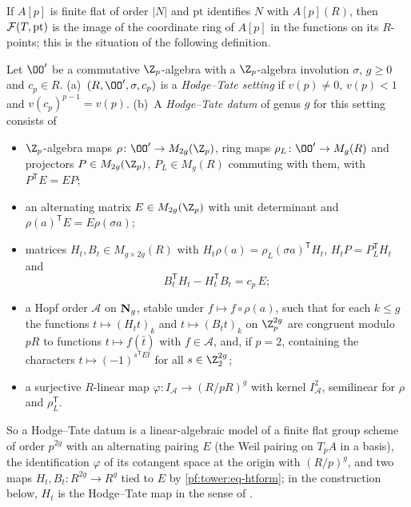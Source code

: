 If $A[p]$ is finite flat of order $|N|$ and $\mathrm{pt}$ identifies $N$ with $A[p](R)$, then $\mathcal F(T,\mathrm{pt})$ is
the image of the coordinate ring of $A[p]$ in the functions on its $R$-points; this is the situation of the following
definition.

\begin{definition}\label{pf:tower:def-htdatum}
Let $\OO'$ be a commutative $\Z_p$-algebra with a $\Z_p$-algebra involution $\sigma$, $g\ge0$ and $c_p\in R$.
(a)~$(R,\OO',\sigma,c_p)$ is a \emph{Hodge--Tate setting} if $v(p)\ne0$, $v(p)<1$ and $v(c_p)^{p-1}=v(p)$.
(b)~A \emph{Hodge--Tate datum} of genus $g$ for this setting consists of
\begin{itemize}
\item $\Z_p$-algebra maps $\rho\colon\OO'\to M_{2g}(\Z_p)$, ring maps $\rho_L\colon\OO'\to M_g(R)$ and
  projectors $P\in M_{2g}(\Z_p)$, $P_L\in M_g(R)$ commuting with them, with $P^{\mathsf T}E=EP$;
\item an alternating matrix $E\in M_{2g}(\Z_p)$ with unit determinant and $\rho(a)^{\mathsf T}E=E\rho(\sigma a)$;
\item matrices $H_t,B_t\in M_{g\times2g}(R)$ with $H_t\rho(a)=\rho_L(\sigma a)^{\mathsf T}H_t$,
  $H_tP=P_L^{\mathsf T}H_t$ and
  \begin{equation}\label{pf:tower:eq-htform}
  B_t^{\mathsf T}H_t-H_t^{\mathsf T}B_t=c_p\,E;
  \end{equation}
\item a Hopf order $\mathcal A$ on $\mathbf N_g$, stable under $f\mapsto f\circ\rho(a)$, such that for each
  $k\le g$ the functions $t\mapsto(H_tt)_k$ and $t\mapsto(B_tt)_k$ on $\Z_p^{2g}$ are congruent modulo $pR$ to
  functions $t\mapsto f(\bar t)$ with $f\in\mathcal A$, and, if $p=2$, containing the characters
  $t\mapsto(-1)^{s^{\mathsf T}Et}$ for all $s\in\Z_2^{2g}$;
\item a surjective $R$-linear map $\varphi\colon I_{\mathcal A}\to(R/pR)^g$ with kernel $I_{\mathcal A}^2$,
  semilinear for $\rho$ and $\rho_L^{\mathsf T}$.
\end{itemize}
\end{definition}

So a Hodge--Tate datum is a linear-algebraic model of a finite flat group scheme of order $p^{2g}$ with an
alternating pairing $E$ (the Weil pairing on $T_pA$ in a basis), the identification $\varphi$ of its
cotangent space at the origin with $(R/p)^g$, and two maps $H_t,B_t\colon R^{2g}\to R^g$ tied to $E$ by
\eqref{pf:tower:eq-htform}; in the construction below, $H_t$ is the Hodge--Tate map in the sense of
\cite{Fontaine1982fd,Faltings1988}.

